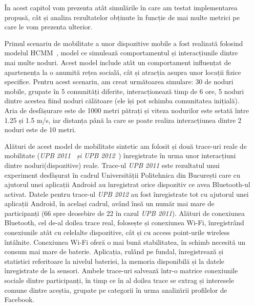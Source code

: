 \documentclass[12pt,a4paper]{report}
\begin{document}
În acest capitol vom prezenta atât simulările în care am testat implementarea propusă, cât și analiza rezultatelor obținute în funcție de mai multe metrici pe care le vom prezenta ulterior.

Primul scenariu de mobilitate a unor dispozitive mobile a fost realizată folosind modelul HCMM~\cite{hcmm}, model ce simulează comportamentul și interacțiunile dintre mai multe noduri. Acest model include atât un comportament influențat de apartenența la o anumită rețea socială, cât și atracția asupra unor locații fizice specifice. Pentru acest scenariu, am creat următoarea simulare: 30 de noduri mobile, grupate în 5 comunități diferite, interacționează timp de 6 ore, 5 noduri dintre acestea fiind noduri călătoare (ele își pot schimba comunitatea inițială). Aria de desfășurare este de 1000 metri pătrați și viteza nodurilor este setată între 1.25 și 1.5 m/s, iar distanța până la care se poate realiza interacțiunea dintre 2 noduri este de 10 metri.

Alături de acest model de mobilitate sintetic am folosit și două trace-uri reale de mobilitate (\textit{UPB 2011~\cite{upb2011} și UPB 2012~\cite{upb2012}}) înregistrate în urma unor interacțiuni dintre noduri(dispozitive) reale. Trace-ul \textit{UPB 2011} este rezultatul unui experiment desfășurat în cadrul Universității Politehnica din București care cu ajutorul unei aplicații Android au înregistrat orice dispozitiv ce avea Bluetooth-ul activat. Datele pentru trace-ul \textit{UPB 2012} au fost înregistrate tot cu ajutorul unei aplicații Android, în același cadrul, având însă un număr mai mare de participanți (66 spre deosebire de 22 în cazul \textit{UPB 2011}). Alături de conexiunea Bluetooth, cel de-al doilea trace real, folosește și conexiunea Wi-Fi, înregistrând conexiunile atât cu celelalte dispozitive, cât și cu access point-urile wireless întâlnite. Conexiunea Wi-Fi oferă o mai bună stabilitatea, în schimb necesită un consum mai mare de baterie. Aplicația, rulând pe fundal, înregistrează și statistici referitoare la nivelul bateriei, la memoria disponibilă și la datele înregistrate de la sensori. Ambele trace-uri salvează într-o matrice conexiunile sociale dintre participanți, în timp ce în al doilea trace se extrag și interesele comune dintre aceștia, grupate pe categorii în urma analizării profilelor de Facebook.
\end{document}
